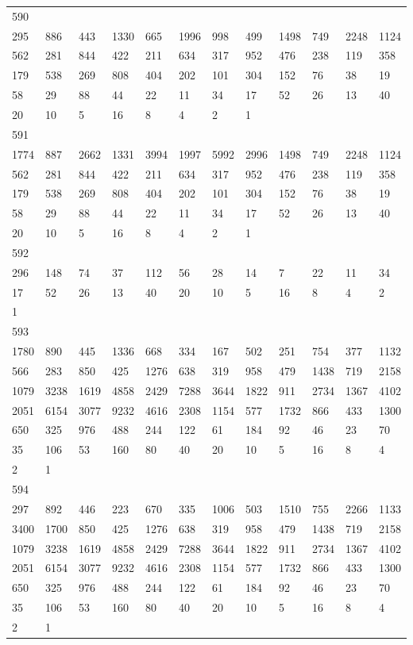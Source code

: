 \begin{longtable}{llllllllllll}
590&&&&&&&&&&&\\
295& 886& 443& 1330& 665& 1996& 998& 499& 1498& 749& 2248& 1124\\
562& 281& 844& 422& 211& 634& 317& 952& 476& 238& 119& 358\\
179& 538& 269& 808& 404& 202& 101& 304& 152& 76& 38& 19\\
58& 29& 88& 44& 22& 11& 34& 17& 52& 26& 13& 40\\
20& 10& 5& 16& 8& 4& 2& 1& \\

591&&&&&&&&&&&\\
1774& 887& 2662& 1331& 3994& 1997& 5992& 2996& 1498& 749& 2248& 1124\\
562& 281& 844& 422& 211& 634& 317& 952& 476& 238& 119& 358\\
179& 538& 269& 808& 404& 202& 101& 304& 152& 76& 38& 19\\
58& 29& 88& 44& 22& 11& 34& 17& 52& 26& 13& 40\\
20& 10& 5& 16& 8& 4& 2& 1& \\

592&&&&&&&&&&&\\
296& 148& 74& 37& 112& 56& 28& 14& 7& 22& 11& 34\\
17& 52& 26& 13& 40& 20& 10& 5& 16& 8& 4& 2\\
1& \\

593&&&&&&&&&&&\\
1780& 890& 445& 1336& 668& 334& 167& 502& 251& 754& 377& 1132\\
566& 283& 850& 425& 1276& 638& 319& 958& 479& 1438& 719& 2158\\
1079& 3238& 1619& 4858& 2429& 7288& 3644& 1822& 911& 2734& 1367& 4102\\
2051& 6154& 3077& 9232& 4616& 2308& 1154& 577& 1732& 866& 433& 1300\\
650& 325& 976& 488& 244& 122& 61& 184& 92& 46& 23& 70\\
35& 106& 53& 160& 80& 40& 20& 10& 5& 16& 8& 4\\
2& 1& \\

594&&&&&&&&&&&\\
297& 892& 446& 223& 670& 335& 1006& 503& 1510& 755& 2266& 1133\\
3400& 1700& 850& 425& 1276& 638& 319& 958& 479& 1438& 719& 2158\\
1079& 3238& 1619& 4858& 2429& 7288& 3644& 1822& 911& 2734& 1367& 4102\\
2051& 6154& 3077& 9232& 4616& 2308& 1154& 577& 1732& 866& 433& 1300\\
650& 325& 976& 488& 244& 122& 61& 184& 92& 46& 23& 70\\
35& 106& 53& 160& 80& 40& 20& 10& 5& 16& 8& 4\\
2& 1& \\


\end{longtable}
